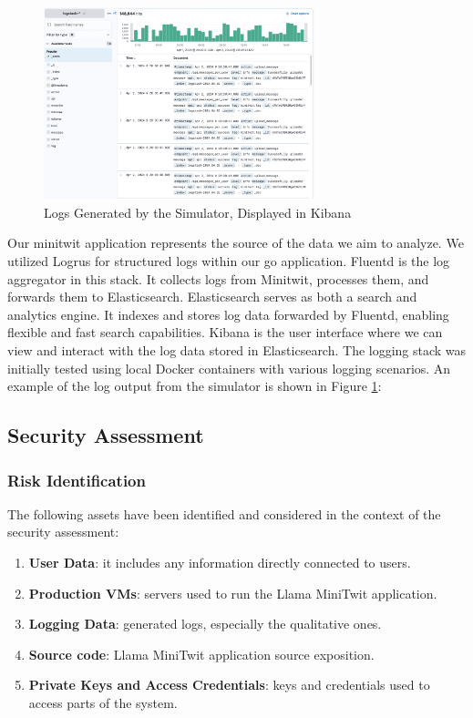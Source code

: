 \documentclass{article}
\begin{document}
\begin{figure}[ht]
    \centering
    \includegraphics[width=0.7\textwidth]{./images/kibana_screenshot.png} 
    \caption{Logs Generated by the Simulator, Displayed in Kibana}
    \label{fig:kibana_screenshot}
\end{figure}

Our minitwit application represents the source of the data we aim to analyze. We utilized Logrus for structured logs within our go application. Fluentd is the log aggregator in this stack. It collects logs from Minitwit, processes them, and forwards them to Elasticsearch. Elasticsearch serves as both a search and analytics engine. It indexes and stores log data forwarded by Fluentd, enabling flexible and fast search capabilities. Kibana is the user interface where we can view and interact with the log data stored in Elasticsearch. The logging stack was initially tested using local Docker containers with various logging scenarios. An example of the log output from the simulator is shown in Figure \ref{fig:kibana_screenshot}:


\subsection{Security Assessment}

\subsubsection{Risk Identification}
The following assets have been identified and considered in the context of the security assessment:

\begin{enumerate}
\item \textbf{User Data}: it includes any information directly connected to users.
\item \textbf{Production VMs}: servers used to run the Llama MiniTwit application.
\item \textbf{Logging Data}: generated logs, especially the qualitative ones.
\item \textbf{Source code}: Llama MiniTwit application source exposition.
\item \textbf{Private Keys and Access Credentials}: keys and credentials used to access parts of the system.
\end{enumerate}
\end{document}
